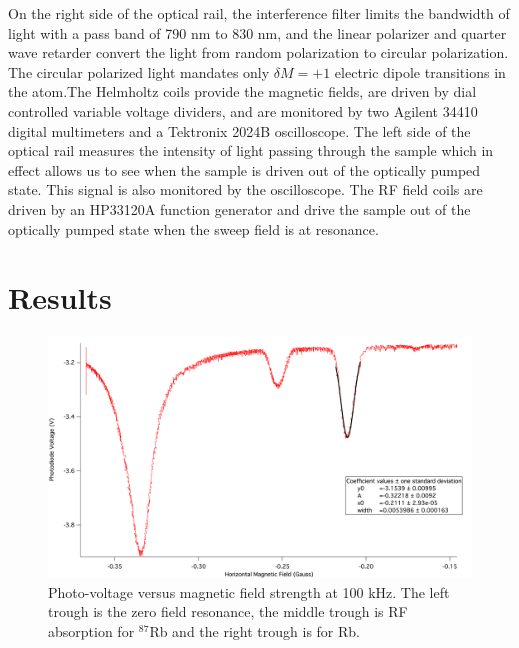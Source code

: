 \documentclass[prb,preprint]{revtex4-1}
\begin{document}
On the right side of the optical rail, the interference filter limits the bandwidth of light with a pass band of 790 nm to 830 nm, and the linear polarizer and quarter wave retarder convert the light from random polarization to circular polarization. The circular polarized light mandates only $\delta M=+1$ electric dipole transitions in the atom.The Helmholtz coils provide the magnetic fields, are driven by dial controlled variable voltage dividers, and are monitored by two Agilent 34410 digital multimeters and a Tektronix 2024B oscilloscope. The left side of the optical rail measures the intensity of light passing through the sample which in effect allows us to see when the sample is driven out of the optically pumped state. This signal is also monitored by the oscilloscope. The RF field coils are driven by an HP33120A function generator and drive the sample out of the optically pumped state when the sweep field is at resonance.


\section{Results}

\begin{figure}[h]
\centering
\includegraphics[width=18cm]{graph0}
\caption{Photo-voltage versus magnetic field strength at 100 kHz. The left trough is the zero field resonance, the middle trough is RF absorption for $^87$Rb and the right trough is for Rb.}
\label{exp}
\end{figure}
\end{document}
